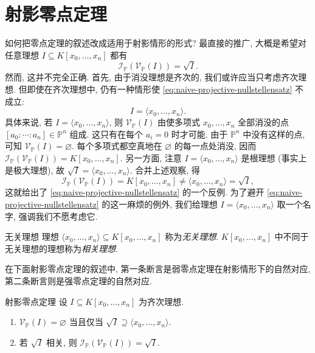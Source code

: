 \section{射影零点定理}\label{sec:projective-nullstellensatz}

如何把零点定理的叙述改成适用于射影情形的形式? 最直接的推广, 大概是希望对任意理想 $I\subseteq K[x_{0},\ldots,x_{n}]$ 都有
\begin{equation}\label{eq:naive-projective-nullstellensatz}
  \mathcal{I}_{\mathbb{P}}(\mathcal{V}_{\mathbb{P}}(I))=\sqrt{I}.
\end{equation}
然而, 这并不完全正确. 首先, 由于消没理想是齐次的, 我们或许应当只考虑齐次理想. 但即使在齐次理想中, 仍有一种情形使 \eqref{eq:naive-projective-nullstellensatz} 不成立:
\[
  I=\langle x_{0},\ldots,x_{n}\rangle.
\]
具体来说, 若 $I=\langle x_{0},\ldots,x_{n}\rangle$, 则 $\mathcal{V}_{\mathbb{P}}(I)$ 由使多项式 $x_{0},\ldots,x_{n}$ 全部消没的点 $[a_{0}:\cdots:a_{n}]\in\mathbb{P}^{n}$ 组成. 这只有在每个 $a_{i}=0$ 时才可能. 由于 $\mathbb{P}^{n}$ 中没有这样的点, 可知 $\mathcal{V}_{\mathbb{P}}(I)=\varnothing$. 每个多项式都空真地在 $\varnothing$ 的每一点处消没, 因而 $\mathcal{I}_{\mathbb{P}}(\mathcal{V}_{\mathbb{P}}(I))=K[x_{0},\ldots,x_{n}]$. 另一方面, 注意 $I=\langle x_{0},\ldots,x_{n}\rangle$ 是根理想 (事实上是极大理想), 故 $\sqrt{I}=\langle x_{0},\ldots,x_{n}\rangle$. 合并上述观察, 得
\[
  \mathcal{I}_{\mathbb{P}}(\mathcal{V}_{\mathbb{P}}(I))
    =K[x_{0},\ldots,x_{n}]\ne\langle x_{0},\ldots,x_{n}\rangle=\sqrt{I},
\]
这就给出了 \eqref{eq:naive-projective-nullstellensatz} 的一个反例. 为了避开 \eqref{eq:naive-projective-nullstellensatz} 的这一麻烦的例外, 我们给理想 $I=\langle x_{0},\ldots,x_{n}\rangle$ 取一个名字, 强调我们不愿考虑它.

\begin{Definition}{无关理想}\leavevmode\label{def:projective-irrelevant-ideal}
理想 $\langle x_{0},\ldots,x_{n}\rangle\subseteq K[x_{0},\ldots,x_{n}]$ 称为\emph{无关理想}. $K[x_{0},\ldots,x_{n}]$ 中不同于无关理想的理想称为\emph{相关理想}.
\end{Definition}

在下面射影零点定理的叙述中, 第一条断言是弱零点定理在射影情形下的自然对应, 第二条断言则是强零点定理的自然对应.

\begin{Theorem}{射影零点定理}\leavevmode\label{thm:projective-nullstellensatz}
设 $I\subseteq K[x_{0},\ldots,x_{n}]$ 为齐次理想.
\begin{enumerate}[label=\arabic*.]
  \item $\mathcal{V}_{\mathbb{P}}(I)=\varnothing$ 当且仅当 $\sqrt{I}\supseteq\langle x_{0},\ldots,x_{n}\rangle$.
  \item 若 $\sqrt{I}$ 相关, 则 $\mathcal{I}_{\mathbb{P}}(\mathcal{V}_{\mathbb{P}}(I))=\sqrt{I}$.
\end{enumerate}
\end{Theorem}

